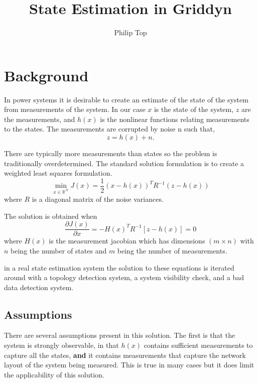 \documentclass[11pt]{article} %
\title{State Estimation in Griddyn}
\author{Philip Top}
\date{} %
\begin{document}
\maketitle

\section{Background}

In power systems it is desirable to create an estimate of the state of the system from measurements of the system.  In our case $x$ is the state of the system,  $z$ are the measurements, and $h(x)$ is the nonlinear functions relating measurements to the states.  The measurements are corrupted by noise n such that,
\begin{equation}
z=h(x)+n.
\end{equation}

There are typically more measurements than states so the problem is traditionally overdetermined.
The standard solution formulation is to create a weighted least squares formulation.
\begin{equation}
\min_{x \in \mathbb{R}^N} J(x)=\frac{1}{2}\left(x-h(x)\right)^T R^{-1}\left (z-h(x)\right)
\end{equation}
where $R$ is a diagonal matrix of the noise variances.

The solution is obtained when
\begin{equation} \label{Eq:sol1}
\frac{\partial J(x)}{\partial x} = -H(x)^T R^{-1} \left[z-h(x)\right] = 0
\end{equation}
where $H(x)$ is the measurement jacobian which has dimensions $(m \times n)$ with $n$ being the number of states and $m$ being the number of measurements.

in a real state estimation system the solution to these equations is iterated around with a topology detection system, a system visibility check, and a bad data detection system.

\subsection{Assumptions}
There are several assumptions present in this solution.
The first is that the system is strongly observable, in that $h(x)$ contains sufficient measurements to capture all the states, \textbf{and} it contains measurements that capture the network layout of the system being measured.  This is true in many cases but it does limit the applicability of this solution.
\end{document}
